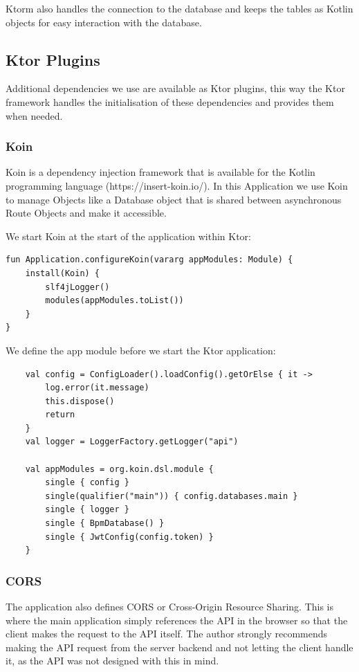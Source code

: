 Ktorm also handles the connection to the database and keeps the tables as Kotlin objects for easy interaction with the database.

\subsection{Ktor Plugins}

Additional dependencies we use are available as Ktor plugins, this way the Ktor framework handles the initialisation of these dependencies and provides them when needed.

\subsubsection{Koin}

Koin is a dependency injection framework that is available for the Kotlin programming language (https://insert-koin.io/). In this Application we use Koin to manage Objects like a Database object that is shared between asynchronous Route Objects and make it accessible.

We start Koin at the start of the application within Ktor:

\begin{verbatim}
fun Application.configureKoin(vararg appModules: Module) {
    install(Koin) {
        slf4jLogger()
        modules(appModules.toList())
    }
}
\end{verbatim}

We define the app module before we start the Ktor application:

\begin{verbatim}
    val config = ConfigLoader().loadConfig().getOrElse { it ->
        log.error(it.message)
        this.dispose()
        return
    }
    val logger = LoggerFactory.getLogger("api")

    val appModules = org.koin.dsl.module {
        single { config }
        single(qualifier("main")) { config.databases.main }
        single { logger }
        single { BpmDatabase() }
        single { JwtConfig(config.token) }
    }
\end{verbatim}


\subsubsection{CORS}

The application also defines CORS or Cross-Origin Resource Sharing. This is where the main application simply references the API in the browser so that the client makes the request to the API itself. The author strongly recommends making the API request from the server backend and not letting the client handle it, as the API was not designed with this in mind.

